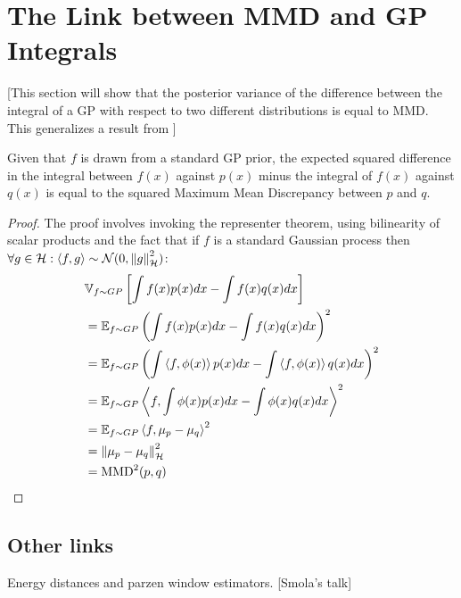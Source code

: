 \documentclass{article} %
\begin{document}
\section{The Link between MMD and GP Integrals}

[This section will show that the posterior variance of the difference between the integral of a GP with respect to two different distributions is equal to MMD.  This generalizes a result from \citep{huszar2012herdingbmcuai}]

\begin{prop} Given that $f$ is drawn from a standard GP prior, the expected squared difference in the integral between $f(x)$ against $p(x)$ minus the integral of $f(x)$ against $q(x)$ is equal to the squared Maximum Mean Discrepancy between $p$ and $q$.
\label{prop:gp_mmd}
\end{prop}
%
\begin{proof}
The proof involves invoking the representer theorem, using bilinearity of scalar products and the fact that if $f$ is a standard Gaussian process then $\forall g\in\mathcal{H}: \left\langle f,g\right\rangle \sim \mathcal{N}(0,\left\|g\right\|_{\mathcal{H}}^2)$:
\begin{align}
	& \mathbb{V}_{f\sim GP} \left[ { \int f(x) p(x) dx -  \int f(x) q(x) dx } \right]\\
	&= \mathbb{E}_{f\sim GP} \left( \int f(x) p(x) dx -  \int f(x) q(x) dx \right)^2\\
	&= \mathbb{E}_{f\sim GP} \left( \int \left\langle f, \phi (x)\right\rangle p(x) dx - \int \left\langle f, \phi (x)\right\rangle q(x) dx \right)^2\\
	&= \mathbb{E}_{f\sim GP} \left\langle f,  \int\phi(x) p(x) dx - \int\phi(x) q(x) dx \right\rangle^2\\
	&= \mathbb{E}_{f\sim GP} \left\langle f,  \mu_p - \mu_{q}\right\rangle^2\\	
	&= \left\|\mu_p - \mu_q\right\|_{\mathcal{H}}^2\\
	&= {\rm MMD}^2(p,q)
\end{align}
\end{proof}


\subsection{Other links}

Energy distances and parzen window estimators. [Smola's talk]
\end{document}
